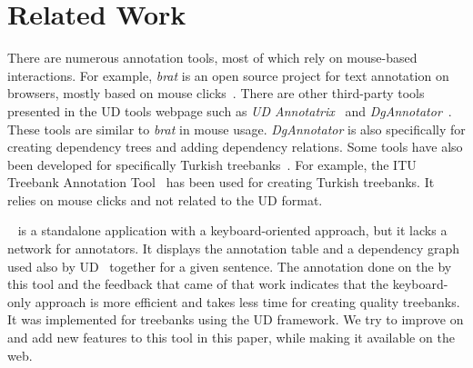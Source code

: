 \section{Related Work}
\label{sec:related}

There are numerous annotation tools, most of which rely on mouse-based interactions.
For example, \textit{brat} is an open source project for text annotation on browsers, mostly based on mouse clicks~\cite{brat,UD}.
There are other third-party tools presented in the UD tools webpage such as \textit{UD Annotatrix}~\cite{tyers-etal:2018} and \textit{DgAnnotator}~\cite{dgannotator}.
These tools are similar to \textit{brat} in mouse usage.
\textit{DgAnnotator} is also specifically for creating dependency trees and adding dependency relations.
Some tools have also been developed for specifically Turkish treebanks~\cite{turk-etal-2019-turkish}.
For example, the ITU Treebank Annotation Tool~\cite{pamay-etal-2015-annotation} has been used for creating Turkish treebanks.
It relies on mouse clicks and not related to the UD format.

\boatvone~\cite{turk-etal-2019-turkish} is a standalone application with a keyboard-oriented approach, but it lacks a network for annotators.
It displays the annotation table and a dependency graph used also by UD~\cite{UD} together for a given sentence.
The annotation done on the \bountreebank{} by this tool and the feedback that came of that work indicates that the keyboard-only approach is more efficient and takes less time for creating quality treebanks.
It was implemented for treebanks using the UD framework.
We try to improve on and add new features to this tool in this paper, while making it available on the web.
